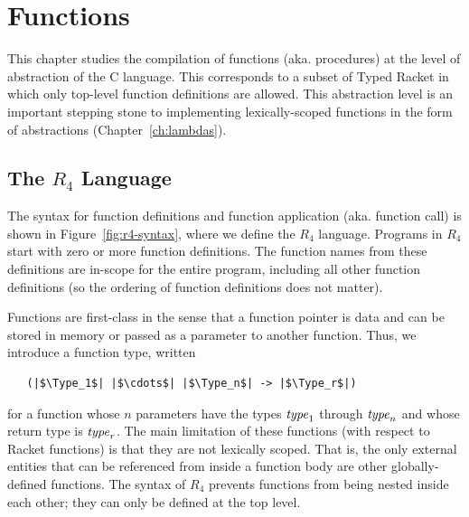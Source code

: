 \documentclass[11pt]{book}
\begin{document}
\chapter{Functions}
\label{ch:functions}

This chapter studies the compilation of functions (aka. procedures) at
the level of abstraction of the C language. This corresponds to a
subset of Typed Racket in which only top-level function definitions
are allowed. This abstraction level is an important stepping stone to
implementing lexically-scoped functions in the form of 
abstractions (Chapter~\ref{ch:lambdas}).

\section{The $R_4$ Language}

The syntax for function definitions and function application
(aka. function call) is shown in Figure~\ref{fig:r4-syntax}, where we
define the $R_4$ language.  Programs in $R_4$ start with zero or more
function definitions.  The function names from these definitions are
in-scope for the entire program, including all other function
definitions (so the ordering of function definitions does not matter).

Functions are first-class in the sense that a function pointer is data
and can be stored in memory or passed as a parameter to another
function.  Thus, we introduce a function type, written
\begin{lstlisting}
   (|$\Type_1$| |$\cdots$| |$\Type_n$| -> |$\Type_r$|)
\end{lstlisting}
for a function whose $n$ parameters have the types $\mathit{type}_1$ through
$\mathit{type}_n$ and whose return type is $\mathit{type}_r$. The main limitation of
these functions (with respect to Racket functions) is that they are
not lexically scoped. That is, the only external entities that can be
referenced from inside a function body are other globally-defined
functions. The syntax of $R_4$ prevents functions from being nested
inside each other; they can only be defined at the top level.
\end{document}
